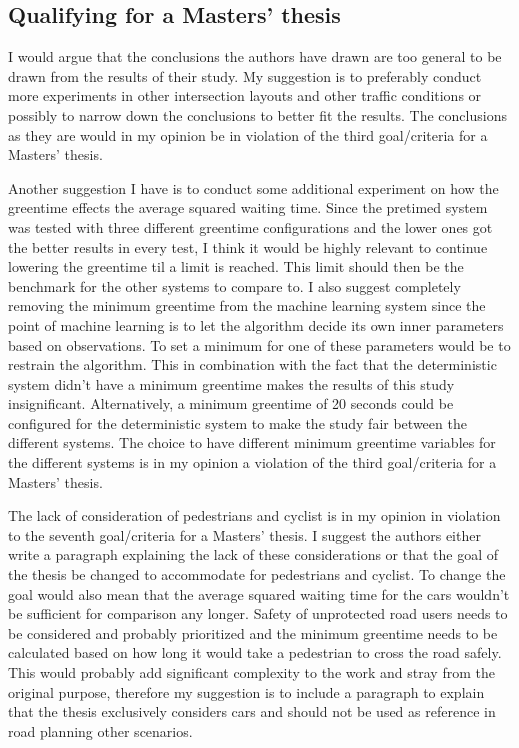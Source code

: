 \documentclass[10pt, a4paper]{article}
\begin{document}
\subsection{Qualifying for a Masters' thesis}
I would argue that the conclusions the authors have drawn are too general to be drawn from the results of their study. My suggestion is to
preferably conduct more experiments in other intersection layouts and other traffic conditions or possibly to narrow down the conclusions
to better fit the results. The conclusions as they are would in my opinion be in violation of the third goal/criteria for a Masters' thesis.

Another suggestion I have is to conduct some additional experiment on how the greentime effects the average squared waiting time. Since the
pretimed system was tested with three different greentime configurations and the lower ones got the better results in every test, I think it 
would be highly relevant to continue lowering the greentime til a limit is reached. This limit should then be the benchmark for the other systems
to compare to. I also suggest completely removing the minimum greentime from the machine learning system since the point of machine learning is
to let the algorithm decide its own inner parameters based on observations. To set a minimum for one of these parameters would be to restrain
the algorithm. This in combination with the fact that the deterministic system didn't have a minimum greentime makes the results of this study
insignificant. Alternatively, a minimum greentime of 20 seconds could be configured for the deterministic system to make the study fair
between the different systems. The choice to have different minimum greentime variables for the different systems is in my opinion a violation
of the third goal/criteria for a Masters' thesis.

The lack of consideration of pedestrians and cyclist is in my opinion in violation to the seventh goal/criteria for a Masters' thesis. I suggest
the authors either write a paragraph explaining the lack of these considerations or that the goal of the thesis be changed to accommodate for
pedestrians and cyclist. To change the goal would also mean that the average squared waiting time for the cars wouldn't be sufficient for comparison
any longer. Safety of unprotected road users needs to be considered and probably prioritized and the minimum greentime needs to be calculated based
on how long it would take a pedestrian to cross the road safely. This would probably add significant complexity to the work and stray from the original
purpose, therefore my suggestion is to include a paragraph to explain that the thesis exclusively considers cars and should not be used as reference
in road planning other scenarios.
\end{document}

